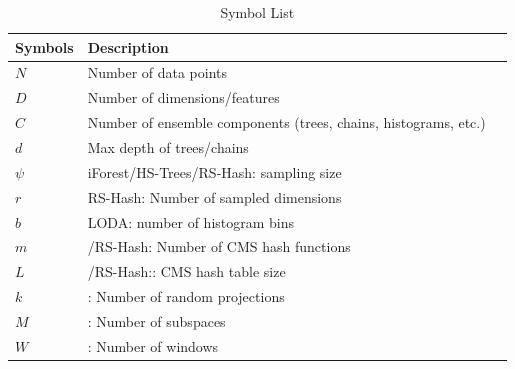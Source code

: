 \begin{table}[h!]
	\caption{Symbol List}
	\centering
	\begin{tabular}{lll}
		\toprule
		\textbf{Symbols} & \textbf{Description}	\\	\hline
		$N$ & Number of data points	\\	\hline
		$D$ & Number of dimensions/features	\\	\hline
		$C$ & Number of ensemble components (trees, chains, histograms, etc.)	\\	\hline
		$d$ & Max depth of trees/chains	\\	\hline
		$\psi$ & iForest/HS-Trees/RS-Hash: sampling size	\\	\hline
		$r$ & RS-Hash: Number of sampled dimensions	\\
		$b$ & LODA: number of histogram bins	\\	\hline
		$m$ & \method/RS-Hash: Number of CMS hash functions	\\
		$L$ & \method/RS-Hash:: CMS hash table size	\\	\hline
		$k$ & \method: Number of random projections	\\
		$M$ & \method: Number of subspaces	\\
		$W$ & \method: Number of windows	\\
		\bottomrule
	\end{tabular}
\end{table}

